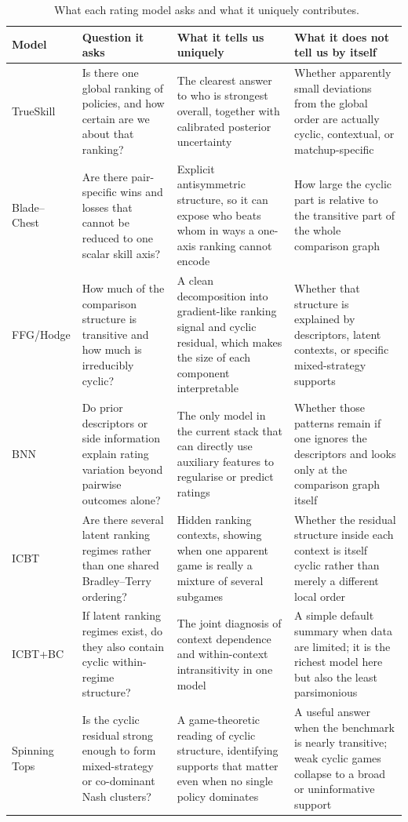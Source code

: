 \documentclass[twoside,twocolumn,9pt]{article}
\begin{document}
\begin{table}[!t]
\small
\caption{\ What each rating model asks and what it uniquely contributes.}
\label{tab:rating_model_roles}
\begin{tabular*}{\textwidth}{@{\extracolsep{\fill}}p{}p{}p{}p{}}
\hline
\textbf{Model} & \textbf{Question it asks} & \textbf{What it tells us uniquely} & \textbf{What it does not tell us by itself}\\
\hline
TrueSkill & Is there one global ranking of policies, and how certain are we about that ranking? & The clearest answer to who is strongest overall, together with calibrated posterior uncertainty & Whether apparently small deviations from the global order are actually cyclic, contextual, or matchup-specific\\
Blade--Chest & Are there pair-specific wins and losses that cannot be reduced to one scalar skill axis? & Explicit antisymmetric structure, so it can expose who beats whom in ways a one-axis ranking cannot encode & How large the cyclic part is relative to the transitive part of the whole comparison graph\\
FFG/Hodge & How much of the comparison structure is transitive and how much is irreducibly cyclic? & A clean decomposition into gradient-like ranking signal and cyclic residual, which makes the size of each component interpretable & Whether that structure is explained by descriptors, latent contexts, or specific mixed-strategy supports\\
BNN & Do prior descriptors or side information explain rating variation beyond pairwise outcomes alone? & The only model in the current stack that can directly use auxiliary features to regularise or predict ratings & Whether those patterns remain if one ignores the descriptors and looks only at the comparison graph itself\\
ICBT & Are there several latent ranking regimes rather than one shared Bradley--Terry ordering? & Hidden ranking contexts, showing when one apparent game is really a mixture of several subgames & Whether the residual structure inside each context is itself cyclic rather than merely a different local order\\
ICBT+BC & If latent ranking regimes exist, do they also contain cyclic within-regime structure? & The joint diagnosis of context dependence and within-context intransitivity in one model & A simple default summary when data are limited; it is the richest model here but also the least parsimonious\\
Spinning Tops & Is the cyclic residual strong enough to form mixed-strategy or co-dominant Nash clusters? & A game-theoretic reading of cyclic structure, identifying supports that matter even when no single policy dominates & A useful answer when the benchmark is nearly transitive; weak cyclic games collapse to a broad or uninformative support\\
\hline
\end{tabular*}
\end{table}
\end{document}
